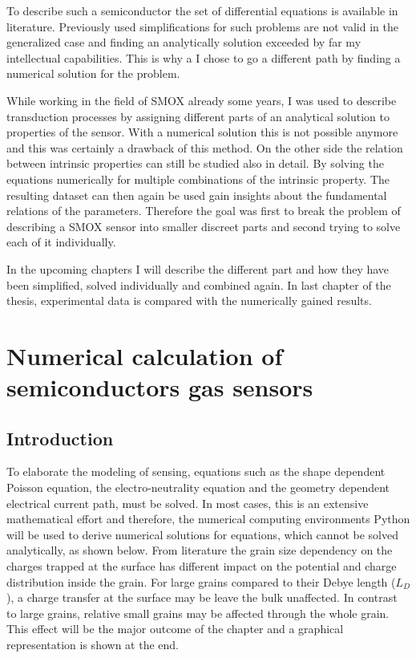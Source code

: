 \documentclass[11pt]{article}
\begin{document}
To describe such a semiconductor the set of differential equations is
available in literature. Previously used simplifications for such
problems are not valid in the generalized case and finding an
analytically solution exceeded by far my intellectual capabilities. This
is why a I chose to go a different path by finding a numerical solution
for the problem.

While working in the field of SMOX already some years, I was used to
describe transduction processes by assigning different parts of an
analytical solution to properties of the sensor. With a numerical
solution this is not possible anymore and this was certainly a drawback
of this method. On the other side the relation between intrinsic
properties can still be studied also in detail. By solving the equations
numerically for multiple combinations of the intrinsic property. The
resulting dataset can then again be used gain insights about the
fundamental relations of the parameters. Therefore the goal was first to
break the problem of describing a SMOX sensor into smaller discreet
parts and second trying to solve each of it individually.

In the upcoming chapters I will describe the different part and how they
have been simplified, solved individually and combined again. In last
chapter of the thesis, experimental data is compared with the
numerically gained results.

    \hypertarget{numerical-calculation-of-semiconductors-gas-sensors}{%
\section{Numerical calculation of semiconductors gas
sensors}\label{numerical-calculation-of-semiconductors-gas-sensors}}

    \hypertarget{introduction}{%
\subsection{Introduction}\label{introduction}}

To elaborate the modeling of sensing, equations such as the shape
dependent Poisson equation, the electro-neutrality equation and the
geometry dependent electrical current path, must be solved. In most
cases, this is an extensive mathematical effort and therefore, the
numerical computing environments Python will be used to derive numerical
solutions for equations, which cannot be solved analytically, as shown
below. From literature \cite{Rothschild2004b} the grain size dependency
on the charges trapped at the surface has different impact on the
potential and charge distribution inside the grain. For large grains
compared to their Debye length (\(L_D\)), a charge transfer at the
surface may be leave the bulk unaffected. In contrast to large grains,
relative small grains may be affected through the whole grain. This
effect will be the major outcome of the chapter and a graphical
representation is shown at the end.
\end{document}
